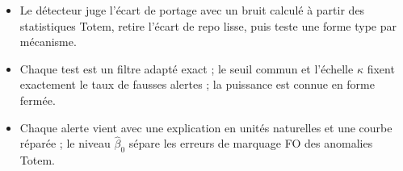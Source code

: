 \begin{retenir}
\begin{itemize}[leftmargin=12pt]
\item Le détecteur juge l'écart de portage avec un bruit calculé à partir des statistiques Totem, retire l'écart de
repo lisse, puis teste une forme type par mécanisme.
\item Chaque test est un filtre adapté exact ; le seuil commun et l'échelle $\kappa$ fixent exactement le taux de
fausses alertes ; la puissance est connue en forme fermée.
\item Chaque alerte vient avec une explication en unités naturelles et une courbe réparée ; le niveau $\hat\beta_0$
sépare les erreurs de marquage FO des anomalies Totem.
\end{itemize}
\end{retenir}
